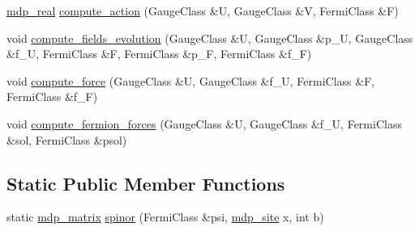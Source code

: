 \begin{DoxyCompactItemize}
\hyperlink{mdp__global__vars_8h_a69d96b74c791e0bbdb888b3913a69450}{mdp\+\_\+real} \hyperlink{class_h_m_c_v_t_k_a3f7dc73a7b73b5def83ed6aa81b56baf}{compute\+\_\+action} (Gauge\+Class \&U, Gauge\+Class \&V, Fermi\+Class \&F)
\item 
void \hyperlink{class_h_m_c_v_t_k_adc97bfb3acf63780adb9e7af9ae578a7}{compute\+\_\+fields\+\_\+evolution} (Gauge\+Class \&U, Gauge\+Class \&p\+\_\+U, Gauge\+Class \&f\+\_\+U, Fermi\+Class \&F, Fermi\+Class \&p\+\_\+F, Fermi\+Class \&f\+\_\+F)
\item 
void \hyperlink{class_h_m_c_v_t_k_a9705754538f098bab074dfa9c5486f54}{compute\+\_\+force} (Gauge\+Class \&U, Gauge\+Class \&f\+\_\+U, Fermi\+Class \&F, Fermi\+Class \&f\+\_\+F)
\item 
void \hyperlink{class_h_m_c_v_t_k_a6bd487e5258df0c909fba60c63fe4101}{compute\+\_\+fermion\+\_\+forces} (Gauge\+Class \&U, Gauge\+Class \&f\+\_\+U, Fermi\+Class \&sol, Fermi\+Class \&psol)
\end{DoxyCompactItemize}
\subsection*{Static Public Member Functions}
\begin{DoxyCompactItemize}
\item 
static \hyperlink{classmdp__matrix}{mdp\+\_\+matrix} \hyperlink{class_h_m_c_v_t_k_a94c7ed3416594292430064dabd62e504}{spinor} (Fermi\+Class \&psi, \hyperlink{classmdp__site}{mdp\+\_\+site} x, int b)
\end{DoxyCompactItemize}
